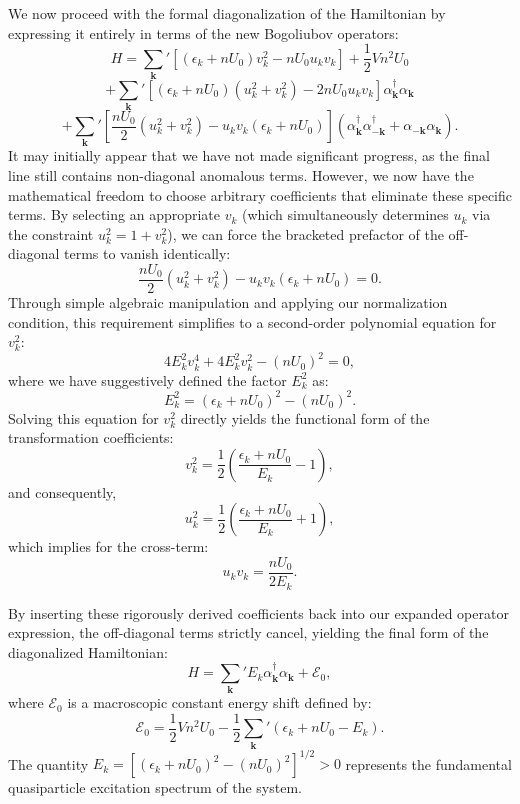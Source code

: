 We now proceed with the formal diagonalization of the Hamiltonian by expressing it entirely in terms of the new Bogoliubov operators:
\[
    H = \sum_{\mathbf{k}}' \left[ (\epsilon_k + nU_0)v_k^2 - nU_0 u_k v_k \right] + \frac{1}{2}Vn^2U_0
\]
\[
    + \sum_{\mathbf{k}}' \left[ (\epsilon_k + nU_0)(u_k^2 + v_k^2) - 2nU_0 u_k v_k \right] \alpha_{\mathbf{k}}^\dagger \alpha_{\mathbf{k}}
\]
\[
    + \sum_{\mathbf{k}}' \left[ \frac{nU_0}{2}(u_k^2 + v_k^2) - u_k v_k(\epsilon_k + nU_0) \right] (\alpha_{\mathbf{k}}^\dagger \alpha_{-\mathbf{k}}^\dagger + \alpha_{-\mathbf{k}} \alpha_{\mathbf{k}}).
\]
It may initially appear that we have not made significant progress, as the final line still contains non-diagonal anomalous terms. However, we now have the mathematical freedom to choose arbitrary coefficients that eliminate these specific terms. By selecting an appropriate \( v_k \) (which simultaneously determines \( u_k \) via the constraint \( u_k^2 = 1 + v_k^2 \)), we can force the bracketed prefactor of the off-diagonal terms to vanish identically:
\[
    \frac{nU_0}{2}(u_k^2 + v_k^2) - u_k v_k(\epsilon_k + nU_0) = 0.
\]
Through simple algebraic manipulation and applying our normalization condition, this requirement simplifies to a second-order polynomial equation for \( v_k^2 \):
\[
    4E_k^2 v_k^4 + 4E_k^2 v_k^2 - (nU_0)^2 = 0,
\]
where we have suggestively defined the factor \( E_k^2 \) as:
\begin{equation} \label{eq:bogoliubov_spectrum_squared}
    E_k^2 = (\epsilon_k + nU_0)^2 - (nU_0)^2.
\end{equation}
Solving this equation for \( v_k^2 \) directly yields the functional form of the transformation coefficients:
\[
    v_k^2 = \frac{1}{2} \left( \frac{\epsilon_k + nU_0}{E_k} - 1 \right),
\]
and consequently,
\[
    u_k^2 = \frac{1}{2} \left( \frac{\epsilon_k + nU_0}{E_k} + 1 \right),
\]
which implies for the cross-term:
\[
    u_k v_k = \frac{nU_0}{2E_k}.
\]

By inserting these rigorously derived coefficients back into our expanded operator expression, the off-diagonal terms strictly cancel, yielding the final form of the diagonalized Hamiltonian:
\begin{equation} \label{eq:diagonalized_hamiltonian}
    H = \sum_{\mathbf{k}}' E_k \alpha_{\mathbf{k}}^\dagger \alpha_{\mathbf{k}} + \mathcal{E}_0,
\end{equation}
where \( \mathcal{E}_0 \) is a macroscopic constant energy shift defined by:
\[
    \mathcal{E}_0 = \frac{1}{2}Vn^2U_0 - \frac{1}{2}\sum_{\mathbf{k}}' (\epsilon_k + nU_0 - E_k).
\]
The quantity \( E_k = [(\epsilon_k + nU_0)^2 - (nU_0)^2]^{1/2} > 0 \) represents the fundamental quasiparticle excitation spectrum of the system.

